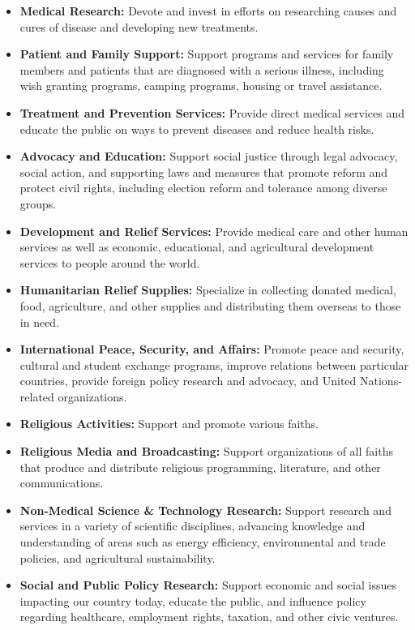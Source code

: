 \begin{itemize}[leftmargin=*]
    \item \textbf{Medical Research:} Devote and invest in efforts on researching causes and cures of disease and developing new treatments.
    \item \textbf{Patient and Family Support:} Support programs and services for family members and patients that are diagnosed with a serious illness, including wish granting programs, camping programs, housing or travel assistance.
    \item \textbf{Treatment and Prevention Services:} Provide direct medical services and educate the public on ways to prevent diseases and reduce health risks.
    \item \textbf{Advocacy and Education:} Support social justice through legal advocacy, social action, and supporting laws and measures that promote reform and protect civil rights, including election reform and tolerance among diverse groups.
    \item \textbf{Development and Relief Services:} Provide medical care and other human services as well as economic, educational, and agricultural development services to people around the world.
    \item \textbf{Humanitarian Relief Supplies:} Specialize in collecting donated medical, food, agriculture, and other supplies and distributing them overseas to those in need.
    \item \textbf{International Peace, Security, and Affairs:} Promote peace and security, cultural and student exchange programs, improve relations between particular countries, provide foreign policy research and advocacy, and United Nations-related organizations.
    \item \textbf{Religious Activities:} Support and promote various faiths.
    \item \textbf{Religious Media and Broadcasting:} Support organizations of all faiths that produce and distribute religious programming, literature, and other communications.
    \item \textbf{Non-Medical Science \& Technology Research:} Support research and services in a variety of scientific disciplines, advancing knowledge and understanding of areas such as energy efficiency, environmental and trade policies, and agricultural sustainability.
    \item \textbf{Social and Public Policy Research:} Support economic and social issues impacting our country today, educate the public, and influence policy regarding healthcare, employment rights, taxation, and other civic ventures.
\end{itemize}


